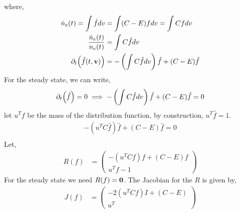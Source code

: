 \documentclass{article}[draft]
\begin{document}
where, 
\begin{align*}
\dot{n}_e (t) = \int \dot{f} dv &= \int (C-E) f dv = \int C f dv \\
\frac{\dot{n}_e (t)}{n_e(t)} &=\int C \hat{f} dv \\
\partial_t\of{\hat{f}(t,\vect{v})} &=-\left(\int C \hat{f} dv \right) \hat{f} + (C-E)\hat{f}
\end{align*}
For the steady state, we can write, 
\begin{align*}
	\partial_t\of{\hat{f}} &=0 \implies -\left(\int C \hat{f} dv \right) \hat{f} + (C-E)\hat{f} =0 \\ 
\end{align*}
let $u^T f$ be the mass of the distribution function, by construction, $u^T \hat{f}=1$.
\begin{align*}
 -(u^T C \hat{f}) \hat{f} + (C-E)\hat{f} =0 \\ 
\end{align*} 
Let, 
\begin{align*}
R(f)&=
\begin{pmatrix}
-(u^T C f) f + (C-E)f \\
u^Tf-1
\end{pmatrix}
\end{align*} For the steady  state we need $R(f) = \mathbf{0}$. The Jacobian for the $R$ is given by, 
\begin{align*}
J(f)&=
\begin{pmatrix}
-2(u^T C f) I + (C-E) \\
u^T
\end{pmatrix}
\end{align*}




\end{document}
